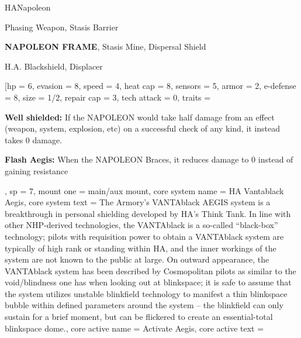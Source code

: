 \begin{mech}{HA}{Napoleon}


\begin{license}
\item Phasing Weapon, Stasis Barrier
\item \textbf{NAPOLEON FRAME}, Stasis Mine, Dispersal Shield
\item H.A. Blackshield, Displacer
\end{license}

\frameBox
[hp = 6,
evasion = 8,
speed = 4,
heat cap = 8,
sensors = 5,
armor = 2,
e-defense = 8,
size = 1/2,
repair cap = 3,
tech attack = 0,
traits = {\textbf{Well shielded:} If the NAPOLEON would take half damage from an effect (weapon, system, explosion, etc) on a successful check of any kind, it instead takes 0 damage.

\textbf{Flash Aegis:} When the NAPOLEON Braces, it reduces damage to 0 instead of gaining resistance},
sp = 7,
mount one = main/aux mount,
core system name = HA Vantablack Aegis,
core system text = {The Armory's VANTAblack AEGIS system is a breakthrough in personal shielding developed by HA's Think Tank. In line with other NHP-derived technologies, the VANTAblack is a so-called ``black-box'' technology; pilots with requisition power to obtain a VANTAblack system are typically of high rank or standing within HA, and the inner workings of the system are not known to the public at large. On outward appearance, the VANTAblack system has been described by Cosmopolitan pilots as similar to the void/blindness one has when looking out at blinkspace; it is safe to assume that the system utilizes unstable blinkfield technology to manifest a thin blinkspace bubble within defined parameters around the system -- the blinkfield can only sustain for a brief moment, but can be flickered to create an essential-total blinkspace dome.},
core active name = Activate Aegis,
core active text ={\QuickAction

}
\end{mech}
